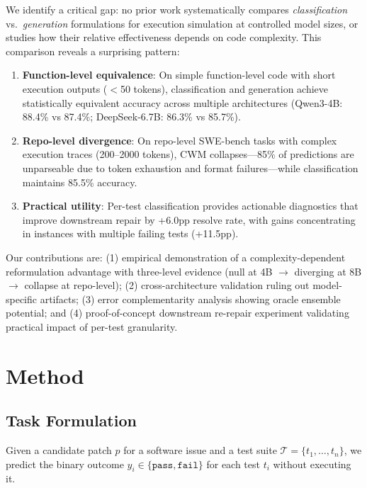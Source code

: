 \documentclass[11pt]{article}
\begin{document}
We identify a critical gap: no prior work systematically compares \emph{classification} vs.\ \emph{generation} formulations for execution simulation at controlled model sizes, or studies how their relative effectiveness depends on code complexity. This comparison reveals a surprising pattern:

\begin{enumerate}
    \item \textbf{Function-level equivalence}: On simple function-level code with short execution outputs ($<$50 tokens), classification and generation achieve statistically equivalent accuracy across multiple architectures (Qwen3-4B: 88.4\% vs 87.4\%; DeepSeek-6.7B: 86.3\% vs 85.7\%).
    \item \textbf{Repo-level divergence}: On repo-level SWE-bench tasks with complex execution traces (200--2000 tokens), CWM collapses---85\% of predictions are unparseable due to token exhaustion and format failures---while classification maintains 85.5\% accuracy.
    \item \textbf{Practical utility}: Per-test classification provides actionable diagnostics that improve downstream repair by +6.0pp resolve rate, with gains concentrating in instances with multiple failing tests (+11.5pp).
\end{enumerate}

Our contributions are: (1) empirical demonstration of a complexity-dependent reformulation advantage with three-level evidence (null at 4B $\to$ diverging at 8B $\to$ collapse at repo-level); (2) cross-architecture validation ruling out model-specific artifacts; (3) error complementarity analysis showing oracle ensemble potential; and (4) proof-of-concept downstream re-repair experiment validating practical impact of per-test granularity.

\section{Method}

\subsection{Task Formulation}

Given a candidate patch $p$ for a software issue and a test suite $\mathcal{T} = \{t_1, \ldots, t_n\}$, we predict the binary outcome $y_i \in \{\texttt{pass}, \texttt{fail}\}$ for each test $t_i$ without executing it.
\end{document}
